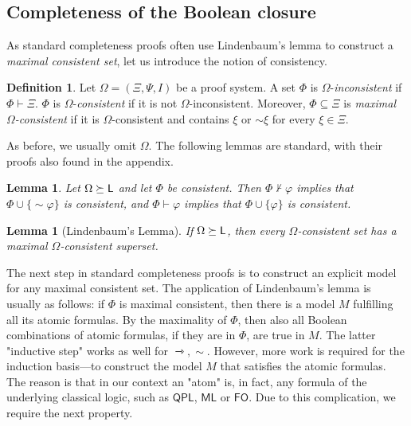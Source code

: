 \documentclass[a4paper,english,fleqn,11pt,final]{scrartcl}
\newcommand{\negg}{{\sim}}
\newcommand{\logic}[1]{\ensuremath{\mathsf{#1}}\xspace}
\newcommand{\QPL}{\logic{QPL}}
\newcommand{\ML}{\logic{ML}}
\newcommand{\FO}{\logic{FO}}
\newcommand{\sfL}{\protect\ensuremath{\mathsf{L}}}
\newcommand{\timp}{\rightarrowtriangle}
\theoremstyle{plain}
\newtheorem{lemma}[theorem]{Lemma}
\theoremstyle{definition}
\newtheorem{definition}[theorem]{Definition}
\begin{document}
\subsection{Completeness of the Boolean closure}

As standard completeness proofs often use Lindenbaum's lemma to construct a \emph{maximal consistent set}, let us introduce the notion of consistency.

\begin{definition}
Let $\Omega = (\Xi, \Psi, I)$ be a proof system.
A set $\Phi$ is $\Omega$-\emph{inconsistent} if $\Phi \vdash \Xi$. $\Phi$ is $\Omega$-\emph{consistent} if it is not $\Omega$-inconsistent.
Moreover, $\Phi \subseteq \Xi$ is \emph{maximal $\Omega$-consistent} if it is $\Omega$-consistent and contains $\xi$ or $\negg\xi$ for every $\xi \in \Xi$.
\end{definition}

As before, we usually omit $\Omega$.
The following lemmas are standard, with their proofs also found in the appendix.

\begin{lemma}\label{lem:only-one-consistent}
Let $\Omega \succeq \sfL$ and let $\Phi$ be consistent.
Then $\Phi \nvdash \varphi$ implies that $\Phi \cup \{ \negg \varphi \}$ is consistent, and $\Phi \vdash \varphi$ implies that $\Phi \cup \{\varphi\}$ is consistent.
\end{lemma}

\begin{lemma}[Lindenbaum's Lemma]\label{lem:lindenbaum}
	If $\Omega \succeq \sfL$, then every $\Omega$-consistent set has a maximal $\Omega$-consistent superset.
\end{lemma}

The next step in standard completeness proofs is to construct an explicit model for any maximal consistent set.
The application of Lindenbaum's lemma is usually as follows:
if $\Phi$ is maximal consistent, then there is a model $M$ fulfilling all its atomic formulas.
By the maximality of $\Phi$, then also all Boolean combinations of atomic formulas, if they are in $\Phi$, are true in $M$.
The latter "inductive step" works as well for $\timp, \negg$.
However, more work is required for the induction basis---to construct the model $M$ that satisfies the atomic formulas.
The reason is that in our context an "atom" is, in fact, any formula of the underlying classical logic, such as $\QPL$, $\ML$ or $\FO$.
Due to this complication, we require the next property.
\end{document}
